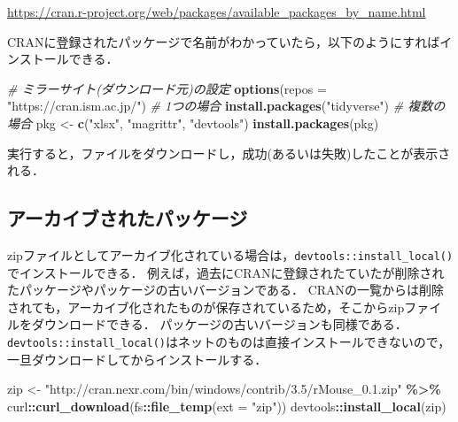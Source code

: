 \documentclass[
]{article}
\newenvironment{Shaded}{\begin{snugshade}}{\end{snugshade}}
\newcommand{\AttributeTok}[1]{\textcolor[rgb]{0.13,0.29,0.53}{#1}}
\newcommand{\CommentTok}[1]{\textcolor[rgb]{0.56,0.35,0.01}{\textit{#1}}}
\newcommand{\FunctionTok}[1]{\textcolor[rgb]{0.13,0.29,0.53}{\textbf{#1}}}
\newcommand{\NormalTok}[1]{#1}
\newcommand{\OtherTok}[1]{\textcolor[rgb]{0.56,0.35,0.01}{#1}}
\newcommand{\SpecialCharTok}[1]{\textcolor[rgb]{0.81,0.36,0.00}{\textbf{#1}}}
\newcommand{\StringTok}[1]{\textcolor[rgb]{0.31,0.60,0.02}{#1}}
\begin{document}
\url{https://cran.r-project.org/web/packages/available_packages_by_name.html}

CRANに登録されたパッケージで名前がわかっていたら，以下のようにすればインストールできる．

\begin{Shaded}
\begin{Highlighting}[]
  \CommentTok{\# ミラーサイト(ダウンロード元)の設定}
\FunctionTok{options}\NormalTok{(}\AttributeTok{repos =} \StringTok{"https://cran.ism.ac.jp/"}\NormalTok{)}
  \CommentTok{\# 1つの場合}
\FunctionTok{install.packages}\NormalTok{(}\StringTok{"tidyverse"}\NormalTok{)}
  \CommentTok{\# 複数の場合}
\NormalTok{pkg }\OtherTok{\textless{}{-}} \FunctionTok{c}\NormalTok{(}\StringTok{"xlsx"}\NormalTok{, }\StringTok{"magrittr"}\NormalTok{, }\StringTok{"devtools"}\NormalTok{)}
\FunctionTok{install.packages}\NormalTok{(pkg)}
\end{Highlighting}
\end{Shaded}

実行すると，ファイルをダウンロードし，成功(あるいは失敗)したことが表示される．

\hypertarget{ux30a2ux30fcux30abux30a4ux30d6ux3055ux308cux305fux30d1ux30c3ux30b1ux30fcux30b8}{%
\subsection{アーカイブされたパッケージ}\label{ux30a2ux30fcux30abux30a4ux30d6ux3055ux308cux305fux30d1ux30c3ux30b1ux30fcux30b8}}

zipファイルとしてアーカイブ化されている場合は，\texttt{devtools::install\_local()}でインストールできる．
例えば，過去にCRANに登録されたていたが削除されたパッケージやパッケージの古いバージョンである．
CRANの一覧からは削除されても，アーカイブ化されたものが保存されているため，そこからzipファイルをダウンロードできる．
パッケージの古いバージョンも同様である．
\texttt{devtools::install\_local()}はネットのものは直接インストールできないので，一旦ダウンロードしてからインストールする．

\begin{Shaded}
\begin{Highlighting}[]
\NormalTok{zip }\OtherTok{\textless{}{-}} 
  \StringTok{"http://cran.nexr.com/bin/windows/contrib/3.5/rMouse\_0.1.zip"} \SpecialCharTok{\%\textgreater{}\%}
\NormalTok{  curl}\SpecialCharTok{::}\FunctionTok{curl\_download}\NormalTok{(fs}\SpecialCharTok{::}\FunctionTok{file\_temp}\NormalTok{(}\AttributeTok{ext =} \StringTok{"zip"}\NormalTok{))}
\NormalTok{devtools}\SpecialCharTok{::}\FunctionTok{install\_local}\NormalTok{(zip)}
\end{Highlighting}
\end{Shaded}
\end{document}
